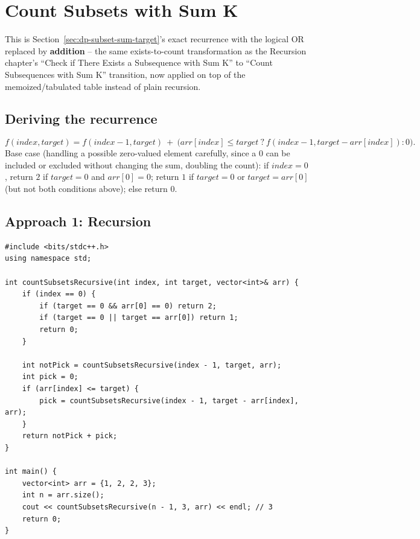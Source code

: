 \section{Count Subsets with Sum K}
\label{sec:dp-count-subsets-sum-k}


\begin{patternbox}
This is Section~\ref{sec:dp-subset-sum-target}'s exact recurrence with
the logical OR replaced by \textbf{addition} -- the same
exists-to-count transformation as the Recursion chapter's
``Check if There Exists a Subsequence with Sum K'' to ``Count
Subsequences with Sum K'' transition,
now applied on top of the memoized/tabulated table instead of plain
recursion.
\end{patternbox}

\subsection*{Deriving the recurrence}

\[
  f(\textit{index}, \textit{target}) = f(\textit{index}{-}1, \textit{target})
  \ +\ \big(\textit{arr}[\textit{index}] \le \textit{target}\ ?\
  f(\textit{index}{-}1, \textit{target}-\textit{arr}[\textit{index}]) : 0\big).
\]
Base case (handling a possible zero-valued element carefully, since a
$0$ can be included or excluded without changing the sum, doubling the
count): if $\textit{index}=0$, return $2$ if $\textit{target}=0$ and
$\textit{arr}[0]=0$; return $1$ if $\textit{target}=0$ or
$\textit{target}=\textit{arr}[0]$ (but not both conditions above); else
return $0$.

\subsection*{Approach 1: Recursion}

\begin{lstlisting}
#include <bits/stdc++.h>
using namespace std;

int countSubsetsRecursive(int index, int target, vector<int>& arr) {
    if (index == 0) {
        if (target == 0 && arr[0] == 0) return 2;
        if (target == 0 || target == arr[0]) return 1;
        return 0;
    }

    int notPick = countSubsetsRecursive(index - 1, target, arr);
    int pick = 0;
    if (arr[index] <= target) {
        pick = countSubsetsRecursive(index - 1, target - arr[index], arr);
    }
    return notPick + pick;
}

int main() {
    vector<int> arr = {1, 2, 2, 3};
    int n = arr.size();
    cout << countSubsetsRecursive(n - 1, 3, arr) << endl; // 3
    return 0;
}
\end{lstlisting}


